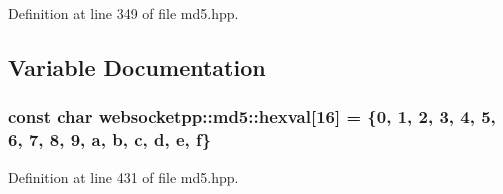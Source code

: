 Definition at line 349 of file md5.\+hpp.



\subsection{Variable Documentation}
\hypertarget{namespacewebsocketpp_1_1md5_a6c9cff96cd43c87cb0fc47f7d641dac8}{}
\subsubsection[{hexval}]{\setlength{\rightskip}{0pt plus 5cm}const char websocketpp\+::md5\+::hexval\mbox{[}16\mbox{]} = \{\textquotesingle{}0\textquotesingle{}, \textquotesingle{}1\textquotesingle{}, \textquotesingle{}2\textquotesingle{}, \textquotesingle{}3\textquotesingle{}, \textquotesingle{}4\textquotesingle{}, \textquotesingle{}5\textquotesingle{}, \textquotesingle{}6\textquotesingle{}, \textquotesingle{}7\textquotesingle{}, \textquotesingle{}8\textquotesingle{}, \textquotesingle{}9\textquotesingle{}, \textquotesingle{}a\textquotesingle{}, \textquotesingle{}b\textquotesingle{}, \textquotesingle{}c\textquotesingle{}, \textquotesingle{}d\textquotesingle{}, \textquotesingle{}e\textquotesingle{}, \textquotesingle{}f\textquotesingle{}\}}\label{namespacewebsocketpp_1_1md5_a6c9cff96cd43c87cb0fc47f7d641dac8}


Definition at line 431 of file md5.\+hpp.

